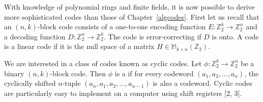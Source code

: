
With knowledge of polynomial rings and finite fields, it is now possible to derive more sophisticated codes than those of Chapter~\ref{algcodes}.  First let us recall that an $(n, k)$-block code consists of a one-to-one encoding function $E:{\mathbb Z}^{k}_{2} \rightarrow {\mathbb Z}^{n}_{2}$ and a decoding function $D:{\mathbb Z}^{n}_{2} \rightarrow {\mathbb Z}^{k}_{2}$.  The code is error-correcting if $D$ is onto.  A code is a linear code if it is the null space of a matrix $H \in {\mathbb M}_{k \times n}({\mathbb Z}_2)$.  

We are interested in a class of codes known as cyclic codes.  Let $\phi : {\mathbb Z}_2^k \rightarrow {\mathbb  Z}_2^n$ be a binary $(n,k)$-block code.  Then $\phi$ is a  if for every codeword $(a_1, a_2, \ldots, a_n )$, the cyclically shifted $n$-tuple $(a_n, a_1, a_2, \ldots, a_{n-1} )$ is also a codeword.  Cyclic codes are particularly easy to implement on a  computer using shift registers [2, 3].  


